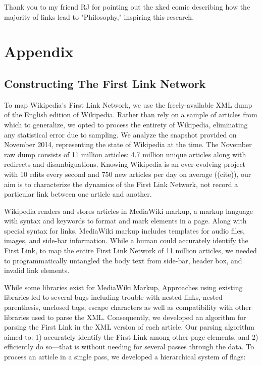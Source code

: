 \documentclass[pre,twocolumn,twoside,superscriptaddress,floatfix, aps, 10pt]{revtex4-1}
\begin{document}
\acknowledgments
Thank you to my friend RJ for pointing out the xkcd comic describing how the majority of links lead to "Philosophy," inspiring this research.


\newpage

\section{Appendix}

\subsection{Constructing The First Link Network}

To map Wikipedia's First Link Network, we use the freely-available XML dump of the English edition of Wikipedia. 
Rather than rely on a sample of articles from which to generalize, we opted to process the entirety of Wikipedia, 
eliminating any statistical error due to sampling.
We analyze the snapshot provided on November 2014, representing the state of Wikipedia at the time.
The November raw dump consists of 11 million articles: 4.7 million unique articles along with redirects
and disambiguations.
Knowing Wikipedia is an ever-evolving project with 10 edits every second and 750 new articles per day on average
((cite)), our aim is to characterize the dynamics of the First Link Network, not record a particular link between one
article and another.

Wikipedia renders and stores articles in MediaWiki markup, a markup language with syntax and keywords to format and mark elements in a page. Along with special syntax for links, MediaWiki markup includes templates for audio files, images, and side-bar
information.
While a human could accurately identify the First Link, to map the entire First Link Network of 11 million articles, we needed to programmatically untangled the body text from side-bar, header box, and invalid link elements.

While some libraries exist for MediaWiki Markup,
Approaches using existing libraries led to several bugs 
including trouble with nested links, nested parenthesis, unclosed tags, escape characters 
as well as compatibility with other libraries used to parse the XML.
Consequently,  we developed an algorithm for parsing the First Link in the XML version of each article.
Our parsing algorithm aimed to: 
1) accurately identify the First Link among other page elements, and 
2) efficiently do so---that is without needing for several passes through the data.
To process an article in a single pass, we developed a hierarchical system of flags:
\end{document}
